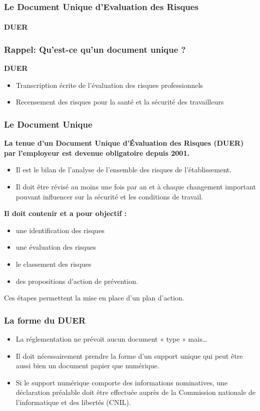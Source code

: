 \documentclass{beamer}
\begin{document}
\begin{frame}
\frametitle{Le Document Unique d’Evaluation des Risques}
\framesubtitle{DUER}
\end{frame}

\begin{frame}
\frametitle{Rappel: Qu’est-ce qu’un document unique ?}
\textbf{DUER}
\begin{itemize}
\item Transcription écrite de l’évaluation des risques professionnels
\item Recensement des risques pour la santé et la sécurité des travailleurs
\end{itemize}
\end{frame}

\begin{frame}
\frametitle{Le Document Unique}
\textbf{La tenue d’un Document Unique d’Évaluation des Risques (DUER) par l’employeur est devenue obligatoire depuis 2001.}
\begin{itemize}
\item Il est le bilan de l’analyse de l’ensemble des risques de l’établissement. 
\item Il doit être révisé au moins une fois par an et à chaque changement important pouvant influencer sur la sécurité et les conditions de travail.
\end{itemize}
\textbf{Il doit contenir et a pour objectif :}
\begin{itemize}
\item une identification des risques
\item une évaluation des risques
\item le classement des risques
\item des propositions d’action de prévention.
\end{itemize}
Ces étapes permettent la mise en place d’un plan d’action.
\end{frame}

\begin{frame}
\frametitle{La forme du DUER}
\begin{itemize}
\item La réglementation ne prévoit aucun document « type » mais…
\item Il doit nécessairement prendre la forme d’un support unique qui peut être aussi bien un document papier que numérique. 
\item Si le support numérique comporte des informations nominatives, une déclaration préalable doit être effectuée auprès de la Commission nationale de l’informatique et des libertés (CNIL). 
\end{itemize}
\end{frame}
\end{document}
